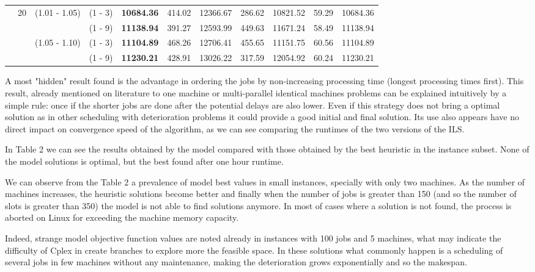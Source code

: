 \documentclass[a4paper,11pt]{article}
\begin{document}
\begin{table}[!ht]
\begin{tabular}{|c|c|c|c|c|c|c|c|c|c|c|}
 & 20 & (1.01 - 1.05) & (1 - 3)  &  \textbf{10684.36}  &  414.02      &  12366.67  &  286.62      &  10821.52  &  59.29      &  10684.36 \\
 &  &  & (1 - 9)  &  \textbf{11138.94}  &  391.27      &  12593.99  &  449.63      &  11671.24  &  58.49      &  11138.94 \\
 &  & (1.05 - 1.10) & (1 - 3)  &  \textbf{11104.89}  &  468.26      &  12706.41  &  455.65      &  11151.75  &  60.56      &  11104.89 \\
 &  &  & (1 - 9)  &  \textbf{11230.21}  &  428.91      &  13026.22  &  317.59      &  12054.92  &  60.24      &  11230.21 \\

\hline

\end{tabular}
\end{table}


A most "hidden" result found is the advantage in ordering the jobs by non-increasing processing time (longest processing times first). This result, already mentioned on literature to one machine or multi-parallel identical machines problems can be explained intuitively by a simple rule: once if the shorter jobs are done after the potential delays are also lower.  Even if this strategy does not bring a optimal solution as in other scheduling with deterioration problems it could provide a good initial and final solution. Its use also appears have no direct impact on convergence speed of the algorithm, as we can see comparing the runtimes of the two versions of the ILS. 

In Table 2 we can see the results obtained by the model compared with those obtained by the best heuristic in the instance subset. None of the model solutions is optimal, but the best found after one hour runtime. 

We can observe from the Table 2 a prevalence of model best values in small instances, specially with only two machines. As the number of machines increases, the heuristic solutions become better and finally when the number of jobs is greater than 150 (and so the number of slots is greater than 350) the model is not able to find solutions anymore. In most of cases where a solution is not found, the process is aborted on Linux for exceeding the machine memory capacity. 

Indeed, strange model objective function values are noted already in instances with 100 jobs and 5 machines, what may indicate the difficulty of Cplex in create branches to explore more the feasible space. In these solutions what commonly happen is a scheduling of several jobs in few machines without any maintenance, making the deterioration grows exponentially and so the makespan. 
\end{document}
